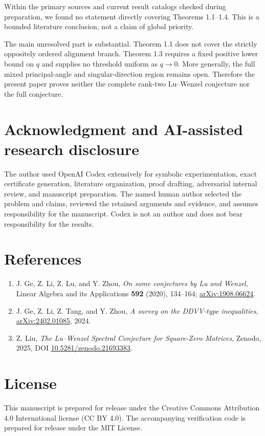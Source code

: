 \documentclass[11pt]{article}
\begin{document}
Within the primary sources and current result catalogs checked during preparation, we found no statement directly covering Theorems 1.1--1.4. This is a bounded literature conclusion, not a claim of global priority.

The main unresolved part is substantial. Theorem 1.1 does not cover the strictly oppositely ordered alignment branch. Theorem 1.3 requires a fixed positive lower bound on $q$ and supplies no threshold uniform as $q\to0$. More generally, the full mixed principal-angle and singular-direction region remains open. Therefore the present paper proves neither the complete rank-two Lu--Wenzel conjecture nor the full conjecture.

\section*{Acknowledgment and AI-assisted research disclosure}

The author used OpenAI Codex extensively for symbolic experimentation, exact certificate generation, literature organization, proof drafting, adversarial internal review, and manuscript preparation. The named human author selected the problem and claims, reviewed the retained arguments and evidence, and assumes responsibility for the manuscript. Codex is not an author and does not bear responsibility for the results.

\section*{References}
\begin{enumerate}

\item J. Ge, Z. Li, Z. Lu, and Y. Zhou, \emph{On some conjectures by Lu and Wenzel}, Linear Algebra and its Applications \textbf{592} (2020), 134--164; \href{https://arxiv.org/abs/1908.06624}{arXiv:1908.06624}.

\item J. Ge, Z. Li, Z. Tang, and Y. Zhou, \emph{A survey on the DDVV-type inequalities}, \href{https://arxiv.org/abs/2402.01085}{arXiv:2402.01085}, 2024.

\item Z. Liu, \emph{The Lu--Wenzel Spectral Conjecture for Square-Zero Matrices}, Zenodo, 2025, DOI \href{https://doi.org/10.5281/zenodo.21693383}{10.5281/zenodo.21693383}.

\end{enumerate}
\section*{License}

This manuscript is prepared for release under the Creative Commons Attribution 4.0 International license (CC BY 4.0). The accompanying verification code is prepared for release under the MIT License.
\end{document}
